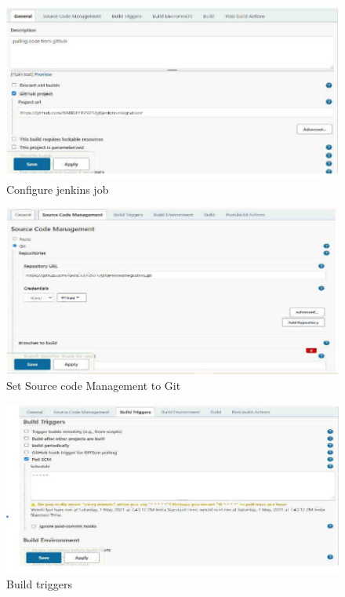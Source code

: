 \documentclass[12pt]{article}
\begin{document}
\begin{enumerate}
\begin{itemize}
\begin{figure}[H]
\centering
\includegraphics[scale=0.8]{fig80}
\caption{Configure jenkins job}
\vspace{0.6\baselineskip}
\end{figure}

\begin{figure}[H]
\centering
\includegraphics[scale=0.8]{fig81}
\caption{Set Source code Management to Git}
\vspace{0.6\baselineskip}
\end{figure}

\begin{figure}[H]
\centering
\includegraphics[scale=0.8]{fig82}
\caption{Build triggers}
\vspace{0.6\baselineskip}
\end{figure}


\end{itemize}
\end{enumerate}
\end{document}
